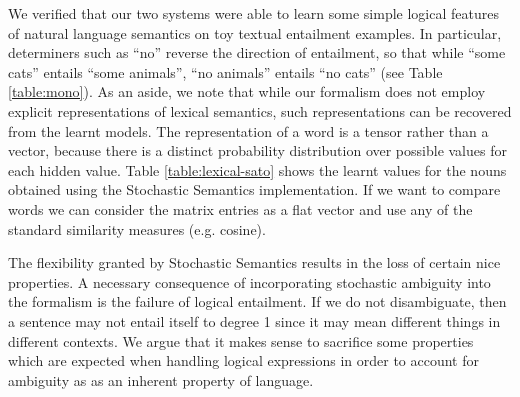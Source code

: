 \documentclass[a4paper,11pt]{article}
\theoremstyle{definition}
\begin{document}
We verified that our two systems were able to learn some simple
logical features of natural language semantics on toy textual
entailment examples. In particular, determiners such as ``no''
reverse the direction of entailment, so that while ``some cats''
entails ``some animals'', ``no animals'' entails ``no cats'' (see Table
\ref{table:mono}). As an aside, we note that while our formalism does not employ explicit representations of lexical semantics, such representations can be recovered from the learnt models. The representation of a word is a tensor rather than a vector, because there is a distinct probability distribution over possible values for each hidden value. Table \ref{table:lexical-sato} shows the learnt values for the nouns obtained using the Stochastic Semantics implementation. 
If we want to compare words 
we can consider the matrix entries as a
flat vector and use any of the standard similarity measures (e.g. 
cosine).



The flexibility granted by Stochastic Semantics results in the loss of certain nice properties. 
%
%
%
A necessary consequence of incorporating stochastic ambiguity into the formalism is the failure of logical entailment.
If we do not disambiguate, then a sentence may not entail itself to degree 1 since it may mean different things in different contexts. We argue that it makes sense to sacrifice some properties which are expected when handling logical expressions in order to account for ambiguity as as an inherent property of language.
\end{document}
